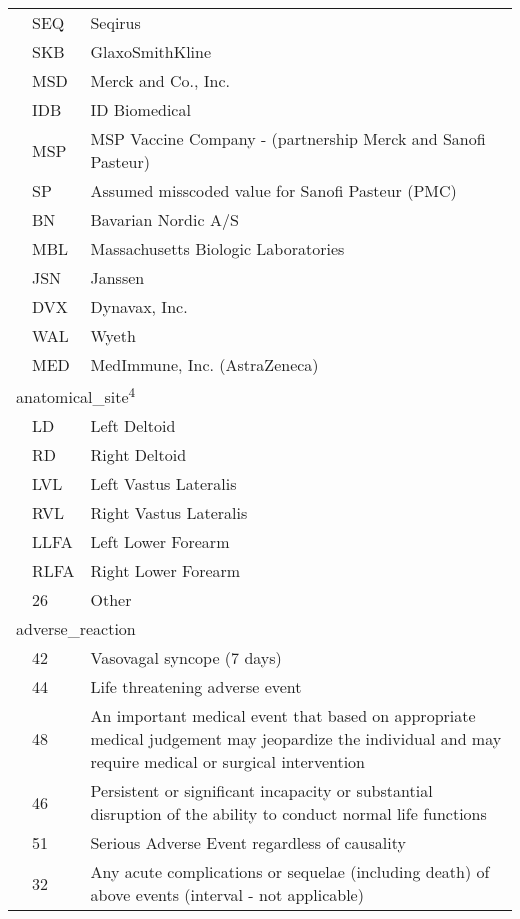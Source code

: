 \documentclass[
  letterpaper,
  DIV=11,
  numbers=noendperiod]{scrreprt}
\begin{document}
\begin{longtable}{l|ll}
  & SEQ & Seqirus \\ 
  & SKB & GlaxoSmithKline \\ 
  & MSD & Merck and Co., Inc. \\ 
  & IDB & ID Biomedical \\ 
  & MSP & MSP Vaccine Company - (partnership Merck and Sanofi Pasteur) \\ 
  & SP & Assumed misscoded value for Sanofi Pasteur (PMC) \\ 
  & BN & Bavarian Nordic A/S \\ 
  & MBL & Massachusetts Biologic Laboratories \\ 
  & JSN & Janssen \\ 
  & DVX & Dynavax, Inc. \\ 
  & WAL & Wyeth \\ 
  & MED & MedImmune, Inc. (AstraZeneca) \\ 
\midrule
\multicolumn{3}{l}{anatomical\_site\textsuperscript{4}} \\ 
\midrule
  & LD & Left Deltoid \\ 
  & RD & Right Deltoid \\ 
  & LVL & Left Vastus Lateralis \\ 
  & RVL & Right Vastus Lateralis \\ 
  & LLFA & Left Lower Forearm \\ 
  & RLFA & Right Lower Forearm \\ 
  & 26 & Other \\ 
\midrule
\multicolumn{3}{l}{adverse\_reaction} \\ 
\midrule
  & 42 & Vasovagal syncope (7 days) \\ 
  & 44 & Life threatening adverse event \\ 
  & 48 & An important medical event that based on appropriate medical judgement may jeopardize the
                         individual and may require medical or surgical intervention \\ 
  & 46 & Persistent or significant incapacity or substantial disruption of the ability to 
                         conduct normal life functions \\ 
  & 51 & Serious Adverse Event regardless of causality \\ 
  & 32 & Any acute complications or sequelae (including death) of above events 
                         (interval - not applicable) \\ 
\bottomrule
\end{longtable}
\end{document}
